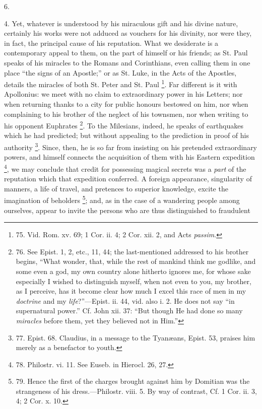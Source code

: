 6.

4. Yet, whatever is understood
by his miraculous gift and his divine nature, certainly his works were
not adduced as vouchers for his divinity, nor were they, in fact, the
principal cause of his reputation. What we desiderate is a
contemporary appeal to them, on the part of himself or his friends; as
St. Paul speaks of his miracles to the Romans and Corinthians, even
calling them in one place ``the signs of an Apostle;'' or as St. Luke,
in the Acts of the Apostles, details the miracles of both St. Peter and St. Paul \footnote{75.
Vid. Rom. xv. 69; 1 Cor. ii. 4; 2 Cor. xii. 2, and Acts \emph{passim}.}.
Far different is it with Apollonius: we meet with no claim to
extraordinary power in his Letters; nor when returning thanks to a
city for public honours bestowed on him, nor when complaining to his
brother of the neglect of his townsmen, nor when writing to his
opponent Euphrates \footnote{76.
See Epist. 1, 2, etc., 11, 44; the last-mentioned addressed to his
brother begins, ``What wonder, that, while the rest of mankind think me
godlike, and some even a god, my own country alone hitherto ignores
me, for whose sake especially I wished to distinguish myself, when not
even to you, my brother, as I perceive, has it become clear how much I
excel this race of men in my \emph{doctrine} and my \emph{life}?''—Epist.
ii. 44, vid. also i. 2. He does not say ``in supernatural power.'' Cf.
John xii. 37: ``But though He had done so many \emph{miracles} before
them, yet they believed not in Him.''}. To
the Milesians, indeed, he speaks of earthquakes which he had
predicted; but without appealing to the prediction in proof of his
authority \footnote{77.
Epist. 68. Claudius, in a message to the Tyanæans, Epist. 53, praises
him merely as a benefactor to youth.}. Since,
then, he is so far from insisting on his pretended extraordinary
powers, and himself connects the acquisition of them with his Eastern
expedition \footnote{78.
Philostr. vi. 11. See Euseb. in Hierocl. 26, 27.}, we may
conclude that credit for possessing magical secrets was a \emph{part}
of the reputation which that expedition conferred. A foreign
appearance, singularity of manners, a life of travel, and pretences to
superior knowledge, excite the imagination of beholders \footnote{79.
Hence the first of the charges brought against him by Domitian was the
strangeness of his dress.—Philostr. viii. 5. By way of contrast, Cf.
1 Cor. ii. 3, 4; 2 Cor. x. 10.}; and, as in the case of a wandering people among ourselves,
appear to invite the persons who are thus distinguished to fraudulent
